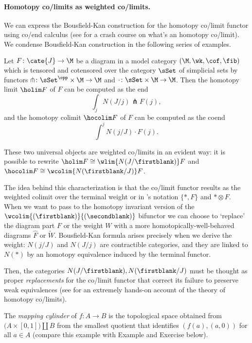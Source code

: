 \paragraph{\bf Homotopy co/limits as weighted co/limits.}
We can express the Bousfield\hyp{}Kan construction for the homotopy co/limit functor using co/end calculus (see  for a crash course on what's an homotopy co/limit). We condense Bousfield\hyp{}Kan construction in the following series of examples.
\begin{theorem}
Let $F \colon \cate{J}\to \M$ be a diagram in a model category $(\M, \wk,\cof,\fib)$ which is tensored and cotensored over the category $\sSet$ of simplicial sets by functors $\pitchfork \colon \sSet^\opp\times \M \to \M$ and $\cdot \colon \sSet \times \M \to \M$. Then the homotopy limit $\holim F$ of $F$ can be computed as the end
\[
\int_j N(J/j)\pitchfork F(j),
\]
and the homotopy colimit $\hocolim F$ of $F$ can be computed as the coend
\[
\int^j N(j/J) \cdot F(j).
\]
\end{theorem}
\begin{remark}
These two universal objects are weighted co/limits in an evident way: it is possible to rewrite $\holim F\cong \wlim{N(J/\firstblank)}F$ and $\hocolim F\cong \wcolim{N(\firstblank/J)}F$.

The idea behind this characterization is that the co/limit functor results as the weighted colimit over the terminal weight or in \cite{}'s notation $\{*,F\}$ and $*\otimes F$. When we want to pass to the homotopy invariant version of the $\wcolim{(\firstblank)}{(\secondblank)}$ bifunctor we can choose to `replace' the diagram part $F$ or the weight $W$ with a more homotopically\hyp{}well\hyp{}behaved diagrams $\hat F$ or $\tilde W$. Bousfield\hyp{}Kan formula arises precisely when we derive the weight: $N(j/J)$ and $N(J/j)$ are contractible categories, and they are linked to $N(*)$ by an homotopy equivalence induced by the terminal functor.

Then, the categories $N(J/\firstblank),N(\firstblank/J)$ must be thought as proper \emph{replacements} for the co/limit functor that correct its failure to preserve weak equivalences (see \cite{strom} for an extremely hands-on account of the theory of homotopy co/limits).
\end{remark}
\begin{example}
The \emph{mapping cylinder} of $f \colon A \to B$ is the topological space obtained from $\big(A\times[0,1]\big) \coprod B$ from the smallest quotient that identifies $(f(a), (a, 0))$ for all $a \in A$ (compare this example with Example  and Exercise  below).
\end{example}
